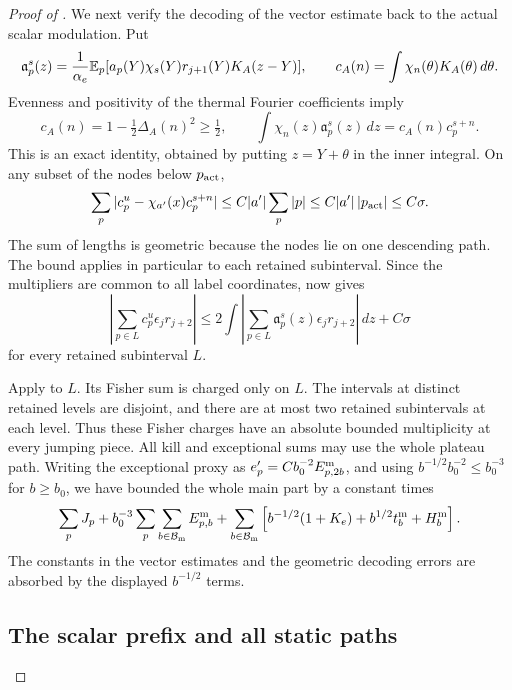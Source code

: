 \begin{proof}[Proof of ]
We next verify the decoding of the vector estimate back to the actual
scalar modulation.  Put
\[
 \mathfrak a_p^s(z)
   =\frac1{\alpha_e}\mathbb E_p[a_p(Y)\chi_s(Y)r_{j+1}(Y)K_A(z-Y)],
 \qquad c_A(n)=\int\chi_n(\theta)K_A(\theta)\,d\theta.
\]
Evenness and positivity of the thermal Fourier coefficients imply
\begin{equation}\label{eq:09-decoding}
 c_A(n)=1-\tfrac12\Delta_A(n)^2\ge\tfrac12,
 \qquad
 \int\chi_n(z)\mathfrak a_p^s(z)\,dz=c_A(n)c_p^{s+n}.
\end{equation}
This is an exact identity, obtained by putting $z=Y+\theta$ in the
inner integral.  On any subset of the nodes below $p_{\rm act}$,
\[
 \sum_p|c_p^u-\chi_{a'}(x)c_p^{s+n}|
 \le C|a'|\sum_p|p|
 \le C|a'|\,|p_{\rm act}|\le C\sigma.
\]
The sum of lengths is geometric because the nodes lie on one descending
path.  The bound applies in particular to each retained subinterval.
Since the multipliers are common to all label coordinates,
 now gives
\begin{equation}\label{eq:09-vector-to-scalar}
 \left|\sum_{p\in L}c_p^u\epsilon_jr_{j+2}\right|
 \le2\int\left|\sum_{p\in L}\mathfrak a_p^s(z)
                           \epsilon_jr_{j+2}\right|\,dz+C\sigma
\end{equation}
for every retained subinterval $L$.

Apply  to $L$.  Its Fisher sum is charged only
on $L$.  The intervals at distinct retained levels are disjoint, and
there are at most two retained subintervals at each level.  Thus these
Fisher charges have an absolute bounded multiplicity at every jumping
piece.  All kill and exceptional sums may use the whole plateau path.
Writing the exceptional proxy as
$e'_p=C b_0^{-2}E_{p,2b}^{\rm m}$, and using
$b^{-1/2}b_0^{-2}\le b_0^{-3}$ for $b\ge b_0$, we have bounded the whole
main part by a constant times
\begin{equation}\label{eq:09-main-path-bound}
 \sum_pJ_p+b_0^{-3}\sum_p\sum_{b\in\mathcal B_{\rm m}}E_{p,b}^{\rm m}
 +\sum_{b\in\mathcal B_{\rm m}}
       \left[b^{-1/2}(1+K_e)+b^{1/2}t_b^{\rm m}+H_b^{\rm m}\right].
\end{equation}
The constants in the vector estimates and the geometric decoding errors
are absorbed by the displayed $b^{-1/2}$ terms.

\subsection*{The scalar prefix and all static paths}


\end{proof}
